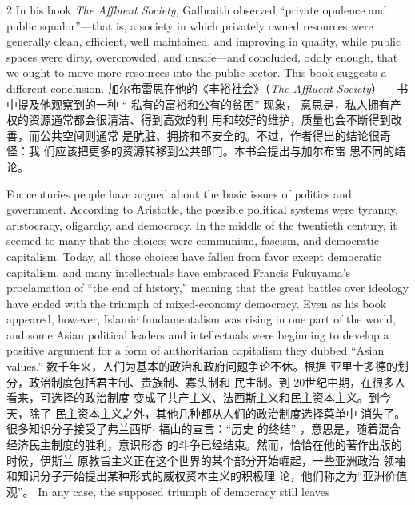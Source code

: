 \begin{paracol}{2}
\switchcolumn*
In his book \textit{The Affluent Society}, Galbraith observed ``private
opulence and public squalor''---that is, a society in which privately owned resources were generally clean, efficient, well
maintained, and improving in quality, while public spaces were
dirty, overcrowded, and unsafe---and concluded, oddly enough,
that we ought to move more resources into the public sector.
This book suggests a different conclusion.
\switchcolumn
加尔布雷思在他的《丰裕社会》（\textit{The Affluent Society}）---
书中提及他观察到的一种 “ 私有的富裕和公有的贫困” 现象，
意思是，私人拥有产权的资源通常都会很清洁、得到高效的利
用和较好的维护，质量也会不断得到改善，而公共空间则通常
是肮脏、拥挤和不安全的。不过，作者得出的结论很奇怪：我
们应该把更多的资源转移到公共部门。本书会提出与加尔布雷
思不同的结论。

For centuries people have argued about the basic issues of politics and government. According to Aristotle, the possible political systems were tyranny, aristocracy, oligarchy, and democracy.
In the middle of the twentieth century, it seemed to many that
the choices were communism, fascism, and democratic capitalism. Today, all those choices have fallen from favor except democratic capitalism, and many intellectuals have embraced
Francis Fukuyama's proclamation of ``the end of history,'' meaning that the great battles over ideology have ended with the triumph of mixed-economy democracy. Even as his book
appeared, however, Islamic fundamentalism was rising in one
part of the world, and some Asian political leaders and intellectuals were beginning to develop a positive argument for a form
of authoritarian capitalism they dubbed ``Asian values.''
\switchcolumn
数千年来，人们为基本的政治和政府问题争论不休。根据
亚里士多德的划分，政治制度包括君主制、贵族制、寡头制和
民主制。到 20世纪中期，在很多人看来，可选择的政治制度
变成了共产主义、法西斯主义和民主资本主义。到今天，除了
民主资本主义之外，其他几种都从人们的政治制度选择菜单中
消失了。很多知识分子接受了弗兰西斯$\cdot$ 福山的宣言：“历史
的终结” ，意思是，随着混合经济民主制度的胜利，意识形态
的斗争已经结束。然而，恰恰在他的著作出版的时候，伊斯兰
原教旨主义正在这个世界的某个部分开始崛起，一些亚洲政治
领袖和知识分子开始提出某种形式的威权资本主义的积极理
论，他们称之为“亚洲价值观”。
\switchcolumn*
In any case, the supposed triumph of democracy still leaves

\end{paracol}
